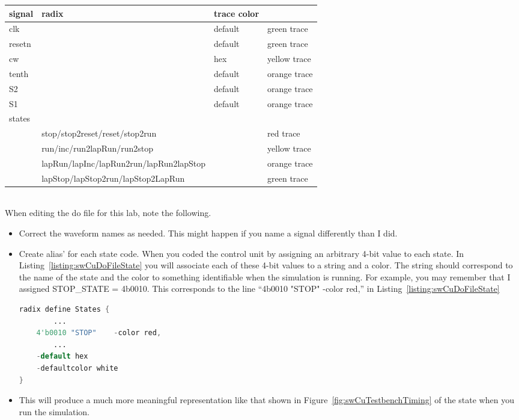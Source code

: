 \begin{tabular}{p{0.5cm}p{1.5cm}p{5cm}p{3cm}}
signal & radix & trace color \\ \hline
clk         & & default         & green trace    \\
resetn     & & default         & green trace    \\
cw         & & hex         & yellow trace    \\
tenth     & & default         & orange trace    \\
S2         & & default         & orange trace    \\
S1         & & default         & orange trace    \\
states     & &           &            \\
& stop/stop2reset/reset/stop2run             & & red trace    \\
& run/inc/run2lapRun/run2stop             & & yellow     trace\\
& lapRun/lapInc/lapRun2run/lapRun2lapStop    & & orange  trace\\
& lapStop/lapStop2run/lapStop2LapRun           &  & green  trace\\
\end{tabular}\\

When editing the do file for this lab, note the following.

\begin{itemize}
\item
    Correct the waveform names as needed. This might happen if you name a
    signal differently than I did.
\item
    Create alias' for each state code. When you coded the control unit by
    assigning an arbitrary 4-bit value to each state. In Listing~\ref{listing:swCuDoFileState} you
    will associate each of these 4-bit values to a string and a color. The
    string should correspond to the name of the state and the color to
    something identifiable when the simulation is running. For example,
    you may remember that I assigned STOP\_STATE =
    4\textquotesingle b0010. This corresponds to the line
    ``4\textquotesingle b0010 "STOP" -color red,'' in Listing~\ref{listing:swCuDoFileState}

  \begin{lstlisting}[language=Verilog,
 caption={Creating alias' for the binary codes of states in the do file uses requires knowing the binary code of each state, the name of each state and the color for each state.},
 label={listing:swCuDoFileState},
 frame=single]
 radix define States {
        ...
    4'b0010 "STOP"    -color red,
        ...
    -default hex
    -defaultcolor white
}
 \end{lstlisting}

\item
    This will produce a much more meaningful representation like that
    shown in Figure~\ref{fig:swCuTestbenchTiming} of the state when you run the simulation.
\end{itemize}

